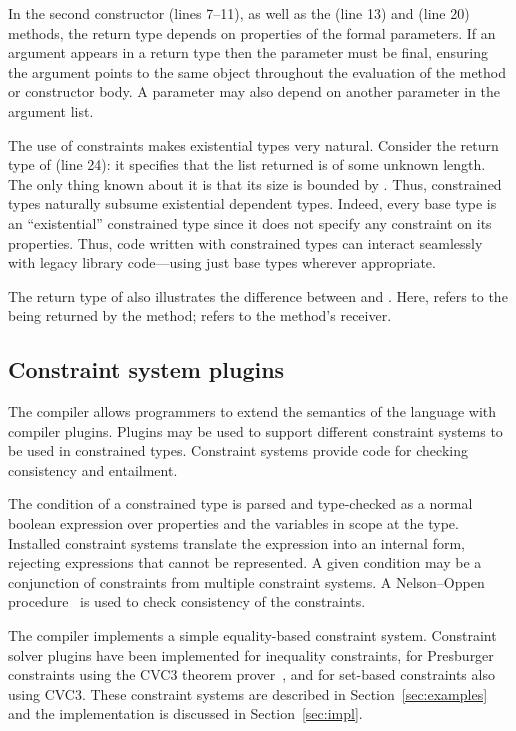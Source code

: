 In the second constructor (lines 7--11), as well as 
the  (line 13) and  (line 20) methods,
the return type
depends on properties of the formal parameters. 
If an argument appears in a
return type then the parameter must be final,
ensuring the
argument points to the same object throughout the evaluation of
the method or constructor body.  A parameter may also depend on
another parameter in the argument list.

The use of constraints makes existential types very natural.
Consider the return type of  (line 24): it specifies
that the list returned is of some unknown length. The only thing
known about it is that its size is bounded by .
Thus,
constrained types naturally subsume existential dependent types.
Indeed, every base type  is an ``existential''
constrained type since it does not specify any constraint on its
properties. Thus, code written with constrained types can
interact seamlessly with legacy library code---using just base
types wherever appropriate.

The return type of  also illustrates the difference
between  and .  Here,  refers to
the  being returned by the method;  refers
to the method's receiver.

\subsection{Constraint system plugins}

The \Xten{} compiler allows  
programmers to extend the semantics of the language with
compiler plugins.  Plugins may be used to support different constraint
systems to be used in constrained types.
Constraint systems provide code for checking consistency and
entailment.

The condition of a constrained type is parsed and type-checked
as a normal boolean expression over properties and
the  variables in scope at the type.  Installed
constraint systems translate the expression into an internal
form, rejecting expressions that cannot be represented.
%
A given condition may be a conjunction of constraints from
multiple constraint systems.
A Nelson--Oppen procedure~\cite{nelson-oppen} is used to check
consistency of the constraints.

The \Xten{} compiler
implements a simple
equality-based constraint system.  Constraint solver plugins
have been implemented for inequality constraints, for
Presburger constraints using
the CVC3 theorem prover~\cite{cvc}, and for
set-based constraints also using CVC3.
These constraint systems are described in
Section~\ref{sec:examples} and the implementation is
discussed in Section~\ref{sec:impl}.

